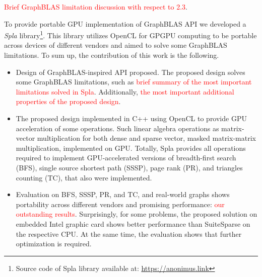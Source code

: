 \textcolor{red}{Brief GraphBLAS limitation discussion with respect to 2.3}.

To provide portable GPU implementation of GraphBLAS API we developed a \textit{Spla} library\footnote{Source code of Spla library available at: \url{https://anonimus.link}}.
This library utilizes OpenCL for GPGPU computing to be portable across devices of different vendors and aimed to solve some GraphBLAS limitations.
To sum up, the contribution of this work is the following.
\begin{itemize}
    \item Design of GraphBLAS-inspired API proposed. The proposed design solves some GraphBLAS limitations, such as \textcolor{red}{brief summary of the most important limitations solved in Spla}. Additionally, \textcolor{red}{the most important additional properties of the proposed design}.
    \item The proposed design implemented in C++ using OpenCL to provide GPU acceleration of some operations. Such linear algebra operations as matrix-vector multiplication for both dense and sparse vector, masked matrix-matrix multiplication, implemented on GPU. Totally, Spla provides all operations required to implement GPU-accelerated versions of breadth-first search (BFS), single source shortest path (SSSP), page rank (PR), and triangles counting (TC), that also were implemented.
    \item Evaluation on BFS, SSSP, PR, and TC, and real-world graphs shows portability across different vendors and promising performance: \textcolor{red}{our outstanding results}. Surprisingly, for some problems, the proposed solution on embedded Intel graphic card shows better performance than SuiteSparse on the respective CPU. At the same time, the evaluation shows that further optimization is required.
\end{itemize}